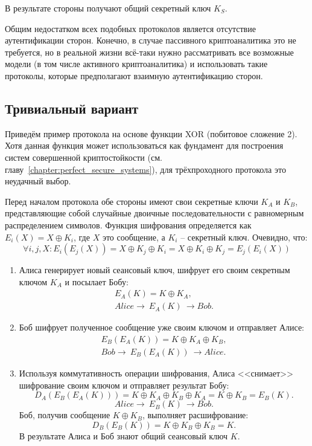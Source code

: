 В результате стороны получают общий секретный ключ $K_S$.

Общим недостатком всех подобных протоколов является отсутствие аутентификации сторон. Конечно, в случае пассивного криптоаналитика это не требуется, но в реальной жизни всё-таки нужно рассматривать все возможные модели (в том числе активного криптоаналитика) и использовать такие протоколы, которые предполагают взаимную аутентификацию сторон.

\subsection{Тривиальный вариант}

Приведём пример протокола на основе функции XOR (побитовое сложение 2). Хотя данная функция может использоваться как фундамент для построения систем совершенной криптостойкости (см. главу~\ref{chapter:perfect_secure_systems}), для трёхпроходного протокола это неудачный выбор.

Перед началом протокола обе стороны имеют свои секретные ключи $K_A$ и $K_B$, представляющие собой случайные двоичные последовательности с равномерным распределением символов. Функция шифрования определяется как $E_i( X ) = X \oplus K_i$, где $X$ это сообщение, а $K_i$ -- секретный ключ. Очевидно, что:
\[ \forall i, j, X: E_i \left( E_j \left( X \right) \right) = X \oplus K_j \oplus K_i = X \oplus K_i \oplus K_j = E_j \left( E_i \left( X \right) \right) \]

\begin{enumerate}
    \item Алиса генерирует новый сеансовый ключ, шифрует его своим секретным ключом $K_A$ и посылает Бобу:
            \[\begin{array}{l}
		E_A(K) = K \oplus K_A, \\
		Alice \rightarrow ~ E_A(K) ~ \rightarrow Bob.
	    \end{array}\]
    \item Боб шифрует полученное сообщение уже своим ключом и отправляет Алисе:
            \[\begin{array}{l}
		E_B(E_A(K)) = K \oplus K_A \oplus K_B, \\
		Bob \rightarrow ~ E_B(E_A(K)) ~ \rightarrow Alice.
	    \end{array}\]
    \item Используя коммутативность операции шифрования, Алиса <<снимает>> шифрование своим ключом и отправляет результат Бобу:
            \[ D_A \left( E_B \left( E_A \left( K \right) \right) \right) = K \oplus K_A \oplus K_B \oplus K_A = K \oplus K_B = E_B \left( K \right). \]
            \[ Alice \rightarrow ~ E_B \left( K \right) ~ \rightarrow Bob. \]
    Боб, получив сообщение $K \oplus K_B$, выполняет расшифрование:
            \[ D_B( E_B( K ) ) = K \oplus K_B \oplus K_B = K. \]
    В результате Алиса и Боб знают общий сеансовый ключ $K$.
\end{enumerate}

